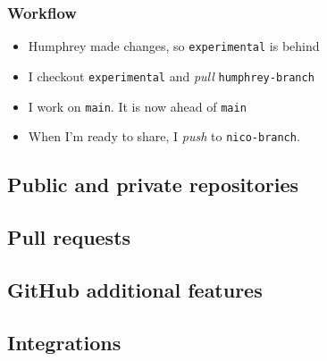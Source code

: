 \documentclass{beamer}
\begin{document}
\begin{frame}[fragile]
    \frametitle{Workflow}
    \begin{itemize}
        \item Humphrey made changes, so \verb|experimental| is behind
        \item I checkout \verb|experimental| and \textit{pull} \verb|humphrey-branch|
        \item I work on \verb|main|. It is now ahead of \verb|main|
        \item When I'm ready to share, I \textit{push} to \verb|nico-branch|.
    \end{itemize}
\end{frame} 

\subsection{Public and private repositories}

\subsection{Pull requests}

\subsection{GitHub additional features}

\subsection{Integrations}
\end{document}

